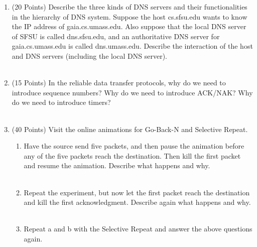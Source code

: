 \documentclass[11pt]{article}
\begin{document}
\begin{enumerate}
    \item (20 Points) Describe the three kinds of DNS servers and their functionalities in the
    hierarchy of DNS system. Suppose the host cs.sfsu.edu wants to know the IP address of
    gaia.cs.umass.edu. Also suppose that the local DNS server of SFSU is called dns.sfsu.edu,
    and an authoritative DNS server for gaia.cs.umass.edu is called dns.umass.edu. Describe
    the interaction of the host and DNS servers (including the local DNS server). \\\\ \answerOne

    \item (15 Points) In the reliable data transfer protocols, why do we need to introduce sequence
    numbers? Why do we need to introduce ACK/NAK? Why do we need to introduce timers? \\\\ \answerTwo
    
    \item (40 Points) Visit the online animations for Go-Back-N and Selective Repeat.
        \begin{enumerate}[label=(\alph*)]
            \item Have the source send five packets, and then pause the animation before any of the five
            packets reach the destination. Then kill the first packet and resume the animation.
            Describe what happens and why. \\\\ \answerThreePartOne
            \item Repeat the experiment, but now let the first packet reach the destination and kill the
            first acknowledgment. Describe again what happens and why. \\\\ \answerThreePartTwo
            \item Repeat a and b with the Selective Repeat and answer the above questions again. \\\\ \answerThreePartThree
        \end{enumerate}
    
\end{enumerate}
\end{document}
